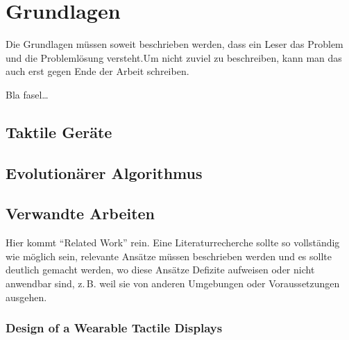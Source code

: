 
\chapter{Grundlagen}
\label{ch:Grundlagen}
Die Grundlagen müssen soweit beschrieben
werden, dass ein Leser das Problem und
die Probleml{\"o}sung  versteht.Um nicht zuviel 
zu beschreiben, kann man das auch erst gegen 
Ende der Arbeit schreiben.

Bla fasel\ldots

\section{Taktile Ger{\"a}te}
\label{ch:Grundlagen:sec:Taktile Ger{\"a}te}






\section{Evolution{\"a}rer Algorithmus}
\label{ch:Grundlagen:sec:Genetischer Algorithmus}




\section{Verwandte Arbeiten}
\label{ch:Grundlagen:sec:RelatedWork}
Hier kommt "`Related Work"' rein.
Eine Literaturrecherche sollte so vollst{\"a}ndig wie m{\"o}glich sein,
relevante Ans{\"a}tze m{\"u}ssen beschrieben werden und es sollte deutlich 
gemacht werden, wo diese Ans{\"a}tze Defizite aufweisen oder nicht
anwendbar sind, z.\,B. weil sie von anderen Umgebungen oder 
Voraussetzungen ausgehen.




\subsection{Design of a Wearable Tactile Displays}




